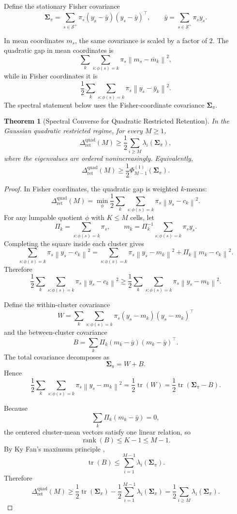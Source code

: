 \documentclass[12pt]{article}
\newtheorem{theorem}{Theorem}[section]
\theoremstyle{definition}
\DeclareMathOperator{\rank}{rank}
\DeclareMathOperator{\tr}{tr}
\newcommand{\norm}[1]{\left\lVert#1\right\rVert}
\newcommand{\RetQuad}{\Delta_{\mathrm{ret}}^{\mathrm{quad}}}
\newcommand{\Splus}{\mathcal S^{+}}
\begin{document}
Define the stationary Fisher covariance
\[
\bm{\Sigma}_\pi
=
\sum_{s\in\Splus}
\pi_s
(y_s-\bar y)(y_s-\bar y)^\top,
\qquad
\bar y=\sum_{s\in\Splus}\pi_s y_s.
\]

In mean coordinates $m_s$, the same covariance is scaled by a factor of $2$.
The quadratic gap in mean coordinates is
\[
\sum_k\sum_{s:\phi(s)=k}\pi_s
\norm{m_s-\bar m_k}^2,
\]
while in Fisher coordinates it is
\[
\frac12
\sum_k\sum_{s:\phi(s)=k}\pi_s
\norm{y_s-\bar y_k}^2.
\]
The spectral statement below uses the Fisher-coordinate covariance
$\bm{\Sigma}_\pi$.

\begin{theorem}[Spectral Converse for Quadratic Restricted Retention]
\label{thm:spectral-retention}
In the Gaussian quadratic restricted regime, for every $M\ge1$,
\[
\RetQuad(M)
\ge
\frac12
\sum_{i\ge M}
\lambda_i(\bm{\Sigma}_\pi),
\]
where the eigenvalues are ordered nonincreasingly.  Equivalently,
\[
\RetQuad(M)
\ge
\frac12
\Phi^{(1)}_{M-1}(\bm{\Sigma}_\pi).
\]
\end{theorem}

\begin{proof}
In Fisher coordinates, the quadratic gap is weighted $k$-means:
\[
\RetQuad(M)
=
\min_{\phi}
\frac12
\sum_{k}
\sum_{s:\phi(s)=k}
\pi_s
\norm{y_s-c_k}^2.
\]
For any lumpable quotient $\phi$ with $K\le M$ cells, let
\[
\Pi_k=\sum_{s:\phi(s)=k}\pi_s,
\qquad
m_k=\Pi_k^{-1}\sum_{s:\phi(s)=k}\pi_s y_s.
\]
Completing the square inside each cluster gives
\[
\sum_{s:\phi(s)=k}
\pi_s
\norm{y_s-c_k}^2
=
\sum_{s:\phi(s)=k}
\pi_s
\norm{y_s-m_k}^2
+
\Pi_k
\norm{m_k-c_k}^2.
\]
Therefore
\[
\frac12
\sum_{k}
\sum_{s:\phi(s)=k}
\pi_s
\norm{y_s-c_k}^2
\ge
\frac12
\sum_{k}
\sum_{s:\phi(s)=k}
\pi_s
\norm{y_s-m_k}^2.
\]

Define the within-cluster covariance
\[
W
=
\sum_{k}
\sum_{s:\phi(s)=k}
\pi_s
(y_s-m_k)(y_s-m_k)^\top
\]
and the between-cluster covariance
\[
B
=
\sum_{k}
\Pi_k
(m_k-\bar y)(m_k-\bar y)^\top.
\]
The total covariance decomposes as
\[
\bm{\Sigma}_\pi=W+B.
\]
Hence
\[
\frac12
\sum_{k}
\sum_{s:\phi(s)=k}
\pi_s
\norm{y_s-m_k}^2
=
\frac12\tr(W)
=
\frac12\tr(\bm{\Sigma}_\pi-B).
\]

Because
\[
\sum_k \Pi_k(m_k-\bar y)=0,
\]
the centered cluster-mean vectors satisfy one linear relation, so
\[
\rank(B)\le K-1\le M-1.
\]
By Ky Fan's maximum principle \cite{kyfan1951},
\[
\tr(B)
\le
\sum_{i=1}^{M-1}
\lambda_i(\bm{\Sigma}_\pi).
\]
Therefore
\[
\RetQuad(M)
\ge
\frac12\tr(\bm{\Sigma}_\pi)
-
\frac12
\sum_{i=1}^{M-1}
\lambda_i(\bm{\Sigma}_\pi)
=
\frac12
\sum_{i\ge M}
\lambda_i(\bm{\Sigma}_\pi).
\]
\end{proof}
\end{document}
